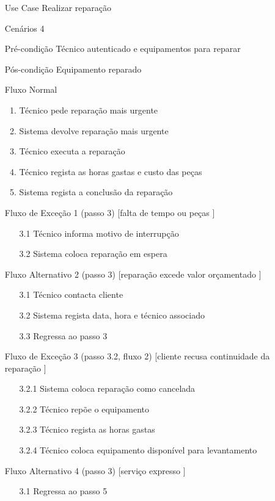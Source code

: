 \documentclass[../relatorio.tex]{subfiles}
\begin{document}
    \begin{itemize}
        \item[Use Case] {Realizar reparação}
        \item[Cenários] {4} 
        \item[Pré-condição] {Técnico autenticado e equipamentos para reparar} 
        \item[Pós-condição] {Equipamento reparado}
        \item[Fluxo Normal] {
            \begin{enumerate}
                \item Técnico pede reparação mais urgente
                \item Sistema devolve reparação mais urgente
                \item Técnico executa a reparação
                \item Técnico regista as horas gastas e custo das peças
                \item Sistema regista a conclusão da reparação
            \end{enumerate}
        }
        \item[Fluxo de Exceção 1 (passo 3) [falta de tempo ou peças]] {
            \begin{itemize}
                \item[3.1]{Técnico informa motivo de interrupção}
                \item[3.2]{Sistema coloca reparação em espera} 
            \end{itemize}
        }
        \item[Fluxo Alternativo 2 (passo 3) [reparação excede valor orçamentado]] {
            \begin{itemize}
                \item[3.1]{Técnico contacta cliente}
                \item[3.2]{Sistema regista data, hora e técnico associado}
                \item[3.3]{Regressa ao passo 3}
            \end{itemize}
        }
        \item[Fluxo de Exceção 3 (passo 3.2, fluxo 2) [cliente recusa continuidade da reparação]] {
            \begin{itemize}
                \item[3.2.1]{Sistema coloca reparação como cancelada}
                \item[3.2.2]{Técnico repõe o equipamento}
                \item[3.2.3]{Técnico regista as horas gastas}
                \item[3.2.4]{Técnico coloca equipamento disponível para levantamento}
            \end{itemize}
        }
        \item[Fluxo Alternativo 4 (passo 3) [serviço expresso]] {
            \begin{itemize}
                \item[3.1]{Regressa ao passo 5}
            \end{itemize}
        }
    \end{itemize}
\end{document}
